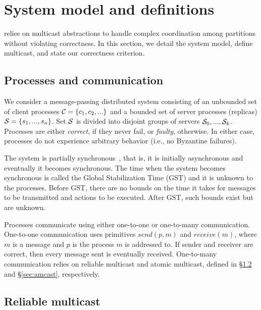 \section{System model and definitions}
\label{sec:sysmodel}

\dynastar relies on multicast abstractions to handle complex coordination among partitions without violating correctness. 
In this section, we detail the system model, define multicast, and state our correctness criterion. 

\subsection{Processes and communication}

We consider a message-passing distributed system consisting of an unbounded set of
client processes $\mathcal{C} = \{c_1, c_2, ...\}$ and a bounded set of
server processes (replicas) $\mathcal{S} = \{s_1, ..., s_n\}$.  Set $\mathcal{S}$ is
divided into disjoint groups of servers $\mathcal{S}_0, ..., \mathcal{S}_k$.
Processes are either \emph{correct}, if they never fail, or
\emph{faulty}, otherwise.  In either case, processes do not experience
arbitrary behavior (i.e., no Byzantine failures).

The system is partially synchronous~\cite{DLS88}, that is, it is initially asynchronous and eventually it becomes synchronous. 
The time when the system becomes synchronous is called the Global Stabilization Time (GST) and it is unknown to the processes.
Before GST, there are no bounds on the time it takes for messages to be transmitted and actions to be executed. 
After GST, such bounds exist but are unknown. 

Processes communicate using either one-to-one or one-to-many communication.  
One-to-one communication uses primitives $send(p,m)$ and $receive(m)$, where $m$
is a message and $p$ is the process $m$ is addressed to.  If sender
and receiver are correct, then every message sent is eventually
received.
%
One-to-many communication relies on reliable multicast and atomic
multicast, defined in \S\ref{sec:rmcast} and \S\ref{sec:amcast}, respectively.

\subsection{Reliable multicast}
\label{sec:rmcast}

